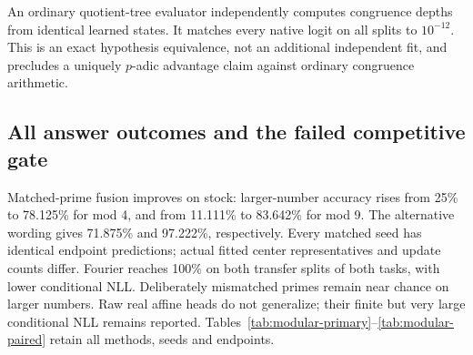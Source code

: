 \documentclass[11pt]{article}
\begin{document}
An ordinary quotient-tree evaluator independently computes congruence depths
from identical learned states. It matches every native logit on all splits
to \(10^{-12}\). This is an exact hypothesis equivalence, not an additional
independent fit, and precludes a uniquely \(p\)-adic advantage claim against
ordinary congruence arithmetic.

\subsection{All answer outcomes and the failed competitive gate}

Matched-prime fusion improves on stock: larger-number accuracy rises from
25\% to 78.125\% for mod 4, and from 11.111\% to 83.642\% for mod 9.
The alternative wording gives 71.875\% and 97.222\%, respectively.
Every matched seed has identical endpoint predictions; actual fitted center
representatives and update counts differ. Fourier reaches 100\% on both
transfer splits of both tasks, with lower conditional NLL. Deliberately
mismatched primes remain near chance on larger numbers. Raw real affine
heads do not generalize; their finite but very large conditional NLL remains
reported. Tables~\ref{tab:modular-primary}--\ref{tab:modular-paired} retain
all methods, seeds and endpoints.
\end{document}
